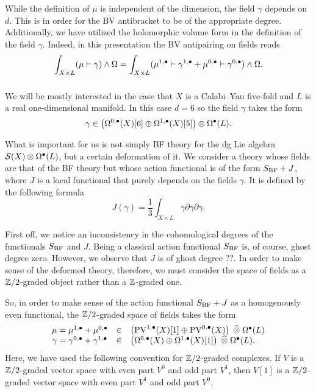 \documentclass[11pt]{amsart}
\def\pv{{\rm PV}}
\begin{document}
While the definition of $\mu$ is independent of the dimension, the field $\gamma$ depends on $d$.
This is in order for the BV antibracket to be of the appropriate degree.
Additionally, we have utilized the holomorphic volume form in the definition of the field $\gamma$.
Indeed, in this presentation the BV antipairing on fields reads
\[
  \int_{X \times L} (\mu \vdash \gamma) \wedge \Omega = \int_{X \times L} (\mu^{1,\bullet} \vdash \gamma^{1,\bullet} + \mu^{0,\bullet} \vdash \gamma^{0,\bullet}) \wedge \Omega .
\]

\subsubsection{}
We will be mostly interested in the case that $X$ is a Calabi--Yau five-fold and $L$ is a real one-dimensional manifold.
In this case $d = 6$ so the field $\gamma$ takes the form
\[
  \gamma \in \left(\Omega^{0,\bullet}(X)[6] \oplus \Omega^{1,\bullet}(X)[5] \right) \otimes \Omega^\bullet(L).
\]

What is important for us is not simply BF theory for the dg Lie algebra $\mathcal S(X) \otimes \Omega^\bullet(L)$, but a certain deformation of it.
We consider a theory whose fields are that of the BF theory but whose action functional is of the form $S_{\rm BF} + J$, where $J$ is a local functional that purely depends on the fields $\gamma$.
It is defined by the following formula
\[
J(\gamma) = \frac13 \int_{X\times L} \gamma \partial \gamma \partial \gamma .
\]

First off, we notice an inconsistency in the cohomological degrees of the functionals $S_{\rm BF}$ and $J$.
Being a classical action functional $S_{\rm BF}$ is, of course, ghost degree zero.
However, we observe that $J$ is of ghost degree $??$.
In order to make sense of the deformed theory, therefore, we must consider the space of fields as a $\mathbb Z/2$-graded object rather than a $\mathbb Z$-graded one.

So, in order to make sense of the action functional $S_{\rm BF} + J$ as a homogenously even functional, the $\mathbb Z/2$-graded space of fields takes the form
\[
  \begin{array}{ccl}
    \mu = \mu^{1,\bu}+\mu^{0,\bu} & \in & \left(\pv^{1,\bu}(X)[1] \oplus \pv^{0,\bu}(X) \right) \; \Hat{\otimes} \; \Omega^{\bu}(L) \\
    \gamma = \gamma^{0,\bu} + \gamma^{1,\bu} & \in & \left(\Omega^{0,\bu}(X) \oplus \Omega^{1,\bu}(X)[1] \right) \; \Hat{\otimes}\; \Omega^{\bu}(L) .
  \end{array}
\]
Here, we have used the following convention for $\mathbb Z/2$-graded complexes.
If $V$ is a $\mathbb Z/2$-graded vector space with even part $V^0$ and odd part $V^1$, then $V[1]$ is a $\mathbb Z/2$-graded vector space with even part $V^1$ and odd part $V^0$.
\end{document}
